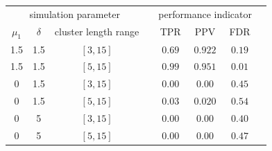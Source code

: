 \documentclass{report}
\begin{document}
\begin{table}[ht]
     \centering
     \begin{tabular}{ c c c c c c c c}
          \toprule
          \multicolumn{3}{c}{simulation parameter} & & \multicolumn{3}{c}{performance indicator} \\
          \cline{1-3} \cline{5-7}
          $\mu_1$ & $\delta$ & cluster length range &  & TPR & PPV & FDR \\
          \midrule
          1.5 & 1.5 & $[3,15]$ & & $0.69$ & $0.922$ & $0.19$ \\
          1.5 & 1.5 & $[5,15]$ & & $0.99$ & $0.951$ & $0.01$ \\
          0   & 1.5 & $[3,15]$ & & $0.00$ & $0.00$ & $0.45$  \\
          0   & 1.5 & $[5,15]$ & & $0.03$ & $0.020$ & $0.54$ \\
          0  & 5   & $[3,15]$ & & $0.00$ & $0.00$ & $0.40$  \\
          0  & 5   & $[5,15]$ & & $0.00$ & $0.00$ & $0.47$  \\
        \bottomrule
     \end{tabular}
\end{table}
\end{document}

